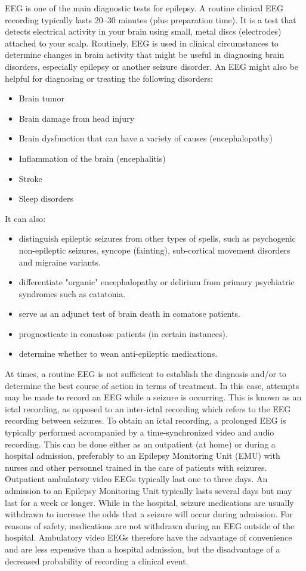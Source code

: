EEG is one of the main diagnostic tests for epilepsy. A routine clinical EEG recording typically lasts 20–30 minutes (plus preparation time). It is a test that detects electrical activity in your brain using small, metal discs (electrodes) attached to your scalp. Routinely, EEG is used in clinical circumstances to determine changes in brain activity that might be useful in diagnosing brain disorders, especially epilepsy or another seizure disorder. An EEG might also be helpful for diagnosing or treating the following disorders:
\begin{itemize}
    \item Brain tumor
    \item Brain damage from head injury
    \item Brain dysfunction that can have a variety of causes (encephalopathy)
    \item Inflammation of the brain (encephalitis)
    \item Stroke
    \item Sleep disorders
\end{itemize}

It can also:
\begin{itemize}
    \item distinguish epileptic seizures from other types of spells, such as psychogenic non-epileptic seizures, syncope (fainting), sub-cortical movement disorders and migraine variants.
    \item differentiate "organic" encephalopathy or delirium from primary psychiatric syndromes such as catatonia.
    \item serve as an adjunct test of brain death in comatose patients.
    \item prognosticate in comatose patients (in certain instances).
    \item determine whether to wean anti-epileptic medications.
\end{itemize}

At times, a routine EEG is not sufficient to establish the diagnosis and/or to determine the best course of action in terms of treatment. In this case, attempts may be made to record an EEG while a seizure is occurring. This is known as an ictal recording, as opposed to an inter-ictal recording which refers to the EEG recording between seizures. To obtain an ictal recording, a prolonged EEG is typically performed accompanied by a time-synchronized video and audio recording. This can be done either as an outpatient (at home) or during a hospital admission, preferably to an Epilepsy Monitoring Unit (EMU) with nurses and other personnel trained in the care of patients with seizures. Outpatient ambulatory video EEGs typically last one to three days. An admission to an Epilepsy Monitoring Unit typically lasts several days but may last for a week or longer. While in the hospital, seizure medications are usually withdrawn to increase the odds that a seizure will occur during admission. For reasons of safety, medications are not withdrawn during an EEG outside of the hospital. Ambulatory video EEGs therefore have the advantage of convenience and are less expensive than a hospital admission, but the disadvantage of a decreased probability of recording a clinical event.

